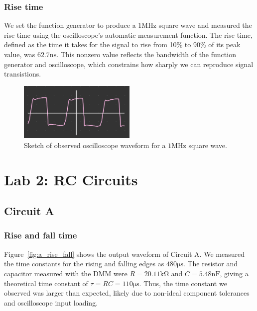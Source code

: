 \documentclass{article}
\begin{document}
\subsubsection{Rise time}

We set the function generator to produce a $1\si{\mega\hertz}$ square wave and
measured the rise time using the oscilloscope's automatic measurement function. The
rise time, defined as the time it takes for the signal to rise from 10\% to 
90\% of its peak value, was $62.7\si{\nano\second}$. This nonzero value 
reflects the bandwidth of the function generator and oscilloscope, which
constrains how sharply we can reproduce signal transistions.

\begin{figure}[H]
    \centering
    \includegraphics[width=0.5\textwidth]{1.4.f.png}
    \caption{Sketch of observed oscilloscope waveform for a $1\si{\mega\hertz}$ square wave.}
    \label{fig:rise_time}
\end{figure}





\section{Lab 2: RC Circuits}

\subsection{Circuit A}

\subsubsection{Rise and fall time}

Figure~\ref{fig:a_rise_fall} shows the output waveform of Circuit A. We measured 
the time constants for the rising and falling edges as $480\si{\micro\second}$. 
The resistor and capacitor measured with the DMM were $R = 20.11\si{\kilo\ohm}$ and 
$C = 5.48\si{\nano\farad}$, giving a theoretical time constant of $\tau = RC = 110\si{\micro\second}$. 
Thus, the time constant we observed was larger than expected, likely due to 
non-ideal component tolerances and oscilloscope input loading.
\end{document}
